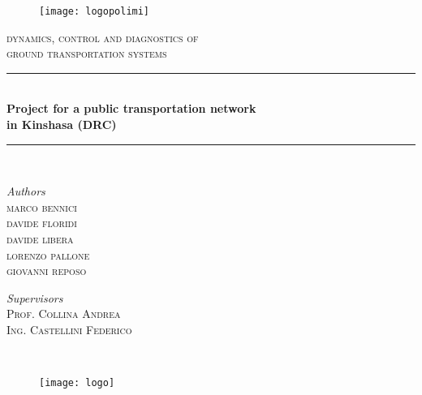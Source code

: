 \documentclass{article}
\begin{document}
\setlength{\parindent}{0pt}
\begin{titlepage}
\newcommand{\HRule}{\rule{\linewidth}{0.5mm}}
\center
\begin{figure}[H]
\centering
\texttt{[image: logopolimi]}
\end{figure}	
\textsc{\Large dynamics, control and diagnostics of \\ground transportation systems}\\[0.5cm] 

\HRule\\[0.2cm]
\center
{\LARGE\bfseries Project for a public transportation network\\
in Kinshasa (DRC)}\\[0.7cm]
\HRule\\[0.5cm]
	\begin{minipage}{0.4\textwidth}
			\large
			\begin{flushleft}
			\textit{Authors}\\
			\textsc{marco bennici\\
			davide floridi\\
			davide libera\\
			lorenzo pallone\\
			giovanni reposo} 
			\end{flushleft}
	\end{minipage}
	\begin{minipage}{0.4\textwidth}
		\begin{flushright}
			\large
			\textit{Supervisors}\\
			\textsc{Prof. Collina Andrea\\
			Ing. Castellini Federico} 
		 \end{flushright}
	\end{minipage}

\renewcommand*\contentsname{Summary}
\
\bigskip
\bigskip

\begin{figure}[H]
\centering
\texttt{[image: logo]}
\end{figure}
\end{titlepage}
\newpage
\
\newpage
\end{document}
